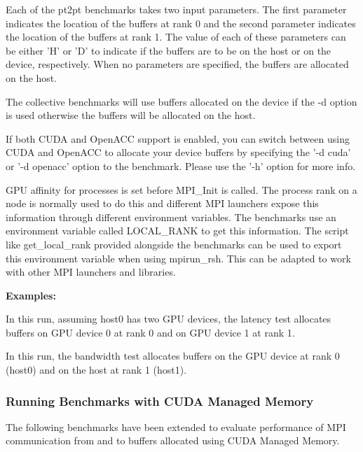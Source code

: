 \noindent Each of the pt2pt benchmarks takes two input parameters. The first
parameter indicates the location of the buffers at rank 0 and the second
parameter indicates the location of the buffers at rank 1. The value of each of
these parameters can be either 'H' or 'D' to indicate if the buffers are to be
on the host or on the device, respectively. When no parameters are specified,
the buffers are allocated on the host.

The collective benchmarks will use buffers allocated on the device if the -d option is used otherwise the buffers will be allocated on the host.

If both CUDA and OpenACC support is enabled, you can switch between using CUDA
and OpenACC to allocate your device buffers by specifying the '-d cuda' or '-d
openacc' option to the benchmark.  Please use the '-h' option for more info.

GPU affinity for processes is set before MPI\_Init is called.  The
process rank on a node is normally used to do this and different MPI launchers
expose this information through different environment variables. The benchmarks
use an environment variable called LOCAL\_RANK to get this information. 
The script like get\_local\_rank provided alongside the benchmarks can be used 
to export this environment variable when using mpirun\_rsh. This can be adapted 
to work with other MPI launchers and libraries.

\noindent\textbf{Examples:}


\noindent In this run, assuming host0 has two GPU devices, the latency test
allocates buffers on GPU device 0 at rank 0 and on GPU device 1 at rank 1.


\noindent In this run, the bandwidth test allocates buffers on the GPU device at rank 0 (host0) 
and on the host at rank 1 (host1). 

\subsubsection{Running Benchmarks with CUDA Managed Memory}
\noindent The following benchmarks have been extended to evaluate performance
of MPI communication from and to buffers allocated using CUDA Managed Memory.

